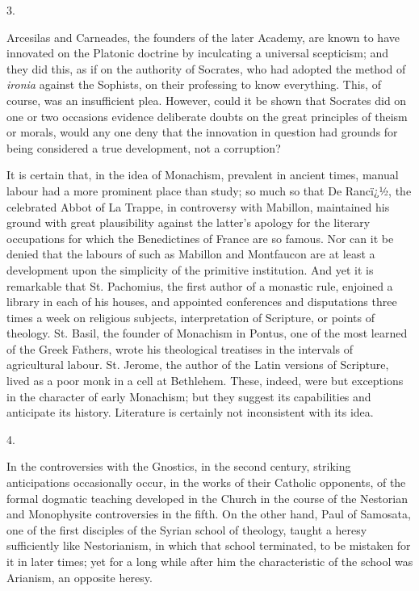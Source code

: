3.

Arcesilas and Carneades, the founders of the later
Academy, are known to have innovated on the Platonic
doctrine by inculcating a universal scepticism; and they
did this, as if on the authority of Socrates, who had
adopted the method of \emph{ironia} against the Sophists,
on their professing to know everything. This, of course,
was an insufficient plea. However, could it be shown that
Socrates did on one or two occasions evidence deliberate
doubts on the great principles of theism or morals, would
any one deny that the innovation in question had grounds
for being considered a true development, not a
corruption?

It is certain that, in the idea of Monachism,
prevalent in ancient times, manual labour had a more
prominent place than study; so much so that De Rancï¿½,
the celebrated Abbot of La Trappe, in controversy with
Mabillon, maintained his ground with great plausibility
against the latter's apology for the literary occupations
for which the Benedictines of France are so famous. Nor
can it be denied that the labours of such as Mabillon and
Montfaucon are at least a development upon the simplicity
of the primitive institution. And yet it is remarkable
that St. Pachomius, the first author of a monastic rule,
enjoined a library in each of his houses, and appointed
conferences and disputations three times a week on
religious subjects, interpretation of Scripture, or
points of theology. St. Basil, the founder of Monachism
in Pontus, one of the most learned of the Greek Fathers,
wrote his theological treatises in the intervals of
agricultural labour. St. Jerome, the author of the Latin
versions of Scripture, lived as a poor monk in a cell at
Bethlehem. These, indeed, were but exceptions in the
character of early Monachism; but they suggest its
capabilities and anticipate its history. Literature is
certainly not inconsistent with its idea.

4.

In the controversies with the Gnostics, in the second
century, striking anticipations occasionally occur, in
the works of their Catholic opponents, of the formal
dogmatic teaching developed in the Church in the course
of the Nestorian and Monophysite controversies in the
fifth. On the other hand, Paul of Samosata, one of the
first disciples of the Syrian school of theology, taught
a heresy sufficiently like Nestorianism, in which that
school terminated, to be mistaken for it in later times;
yet for a long while after him the characteristic of the
school was Arianism, an opposite heresy.

